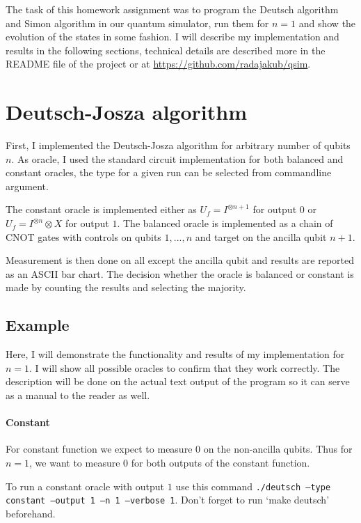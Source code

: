 \documentclass[a4paper,11pt]{article}
\begin{document}
The task of this homework assignment was to program the Deutsch algorithm and Simon algorithm in our quantum simulator, run them for $n = 1$ and show the evolution of the states in some fashion.
I will describe my implementation and results in the following sections, technical details are described more in the README file of the project or at \href{https://github.com/radajakub/qsim}{https://github.com/radajakub/qsim}.

\section{Deutsch-Josza algorithm}
First, I implemented the Deutsch-Josza algorithm for arbitrary number of qubits $n$.
As oracle, I used the standard circuit implementation for both balanced and constant oracles, the type for a given run can be selected from commandline argument.

The constant oracle is implemented either as $U_f = I^{\otimes n + 1}$ for output $0$ or $U_f = I^{\otimes n} \otimes X$ for output $1$.
The balanced oracle is implemented as a chain of CNOT gates with controls on qubits $1, ..., n$ and target on the ancilla qubit $n + 1$.

Measurement is then done on all except the ancilla qubit and results are reported as an ASCII bar chart.
The decision whether the oracle is balanced or constant is made by counting the results and selecting the majority.

\subsection{Example}
Here, I will demonstrate the functionality and results of my implementation for $n = 1$.
I will show all possible oracles to confirm that they work correctly.
The description will be done on the actual text output of the program so it can serve as a manual to the reader as well.

\paragraph{Constant}
For constant function we expect to measure $0$ on the non-ancilla qubits.
Thus for $n = 1$, we want to measure $0$ for both outputs of the constant function.

To run a constant oracle with output $1$ use this command \texttt{./deutsch --type constant --output 1 --n 1 --verbose 1}.
Don't forget to run `make deutsch' beforehand.
\end{document}
